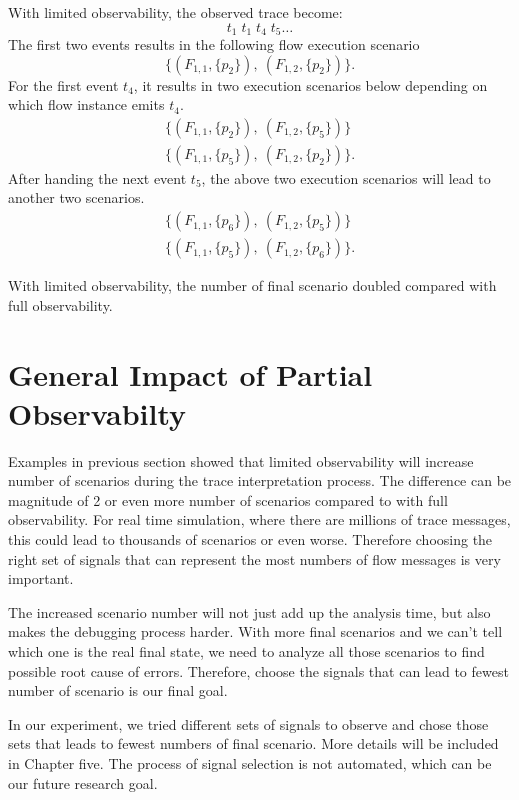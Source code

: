 \documentclass[12pt,frontmatter,copyright,thesis]{usfmanus}
\begin{document}
With limited observability, the observed trace become:  
\[
	t_1\;t_1\;t_4\;t_5\ldots
\]  
The first two events results in
the following flow execution scenario
\[
	\{(F_{1,1}, \{p_2\}),~(F_{1,2}, \{p_2\})\}.
\]
For the first event $t_4$, it results in two execution scenarios 
below depending on which flow instance emits $t_4$.
\[
\begin{array}{l}
	\{(F_{1,1}, \{p_2\}),~(F_{1,2}, \{p_5\})\} \\
	\{(F_{1,1}, \{p_5\}),~(F_{1,2}, \{p_2\})\}.
\end{array}
\]
After handing the next event $t_5$, the above two execution scenarios
will lead to another two scenarios.
\[
\begin{array}{l}
	\{(F_{1,1}, \{p_6\}),~(F_{1,2}, \{p_5\})\} \\
	\{(F_{1,1}, \{p_5\}),~(F_{1,2}, \{p_6\})\}.
\end{array}
\]

With limited observability, the number of final scenario doubled compared with full observability.

\section{General Impact of Partial Observabilty}

Examples in previous section showed that limited observability will increase number of scenarios during
the trace interpretation process. The difference can be magnitude of 2 or even more number of scenarios 
compared to with full observability. 
For real time simulation, where there are millions of trace messages, this could lead to 
 thousands of scenarios or even worse. Therefore choosing the right set of signals that
 can represent the most numbers of flow messages is very important.

The increased scenario number will not just add up the analysis time, but also makes the debugging process
harder. With more final scenarios and we can't tell which one is the real final state, we need to analyze all 
those scenarios to find possible root cause of errors. Therefore, choose the signals that can lead to fewest
 number of scenario is our final goal.
 
In our experiment, we tried different sets of signals to observe and chose those sets that leads to fewest
numbers of final scenario. More details will be included in Chapter five. The process of signal selection is not automated, which can be our future research
 goal. 
\end{document}
